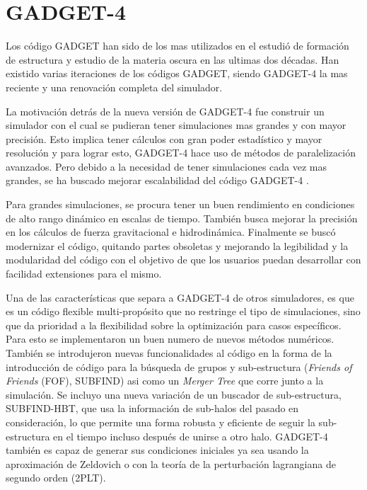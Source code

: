 \section{GADGET-4}

Los código GADGET han sido de los mas utilizados en el estudió de formación de estructura y estudio de la materia oscura en las ultimas dos décadas. Han existido varias iteraciones de los códigos GADGET, siendo GADGET-4 la mas reciente y una renovación completa del simulador. 

La motivación detrás de la nueva versión de GADGET-4 fue construir un simulador con el cual se pudieran tener simulaciones mas grandes y con mayor precisión. Esto implica tener cálculos con gran poder estadístico y mayor resolución y para lograr esto, GADGET-4 hace uso de métodos de paralelización avanzados. Pero debido a la necesidad de tener simulaciones cada vez mas grandes, se ha buscado mejorar escalabilidad del código GADGET-4 \cite{2021MNRAS.506.2871S}.

{\blues Para grandes simulaciones, se procura tener un buen rendimiento en condiciones de alto rango dinámico en escalas de tiempo.} También busca mejorar la precisión en los cálculos de fuerza gravitacional e hidrodinámica. Finalmente se buscó modernizar el código, quitando partes obsoletas y mejorando la legibilidad y la modularidad del código con el objetivo de que los usuarios puedan desarrollar con facilidad extensiones para el mismo. 

 
Una de las características que separa a GADGET-4 de otros simuladores, es que es un código flexible multi-propósito que no restringe el tipo de simulaciones, sino que da prioridad a la flexibilidad sobre la optimización para casos específicos. Para esto se implementaron un buen numero de nuevos métodos numéricos. También se introdujeron nuevas funcionalidades al código en la forma de la introducción de código para la búsqueda de grupos y sub-estructura (\textit{Friends of Friends} (FOF), SUBFIND) asi como un \textit{Merger Tree} que corre junto a la simulación. Se incluyo una nueva variación de un buscador de sub-estructura, SUBFIND-HBT, que usa la información de sub-halos del pasado en consideración, lo que permite una forma robusta y eficiente de seguir la sub-estructura en el tiempo incluso después de unirse a otro halo. GADGET-4 también es capaz de generar sus condiciones iniciales ya sea usando la aproximación de Zeldovich o con la teoría de la perturbación lagrangiana de segundo orden (2PLT)\cite{2021MNRAS.506.2871S}.


